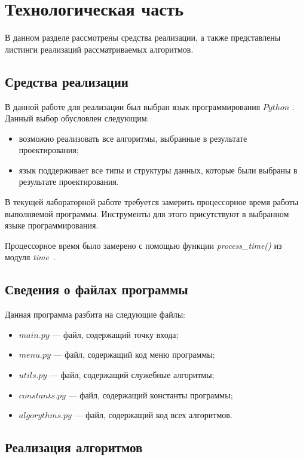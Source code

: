 \chapter{Технологическая часть}

В данном разделе рассмотрены средства реализации, а также представлены листинги реализаций рассматриваемых алгоритмов.

\section{Средства реализации}

В данной работе для реализации был выбран язык программирования $Python$ \cite{python-lang}.
Данный выбор обусловлен следующим: 
\begin{itemize}
	\item возможно реализовать все алгоритмы, выбранные в результате проектирования;
	\item язык поддерживает все типы и структуры данных, которые были выбраны в результате проектирования.
\end{itemize}

В текущей лабораторной работе требуется замерить процессорное время работы выполняемой программы.
Инструменты для этого присутствуют в выбранном языке программирования.

Процессорное время было замерено с помощью функции \textit{process\_time()} из модуля \textit{time}~\cite{python-time}.




\section{Сведения о файлах программы}

Данная программа разбита на следующие файлы:
\begin{itemize}
	\item $main.py$ --- файл, содержащий точку входа;
	\item $menu.py$ --- файл, содержащий код меню программы;
	\item $utils.py$ --- файл, содержащий служебные алгоритмы;
	\item $constants.py$ --- файл, содержащий константы программы;
	\item $algorythms.py$ --- файл, содержащий код всех алгоритмов.
\end{itemize}

\section{Реализация алгоритмов}

